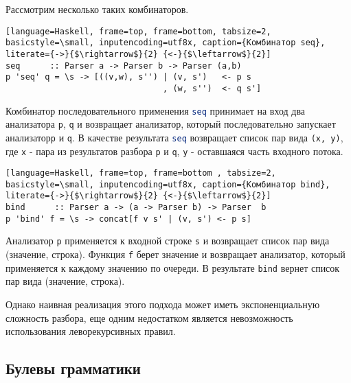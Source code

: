 \documentclass[14pt]{matmex-diploma}
\begin{document}
Рассмотрим несколько таких комбинаторов.

\begin{lstlisting}[language=Haskell, frame=top, frame=bottom, tabsize=2, basicstyle=\small, inputencoding=utf8x, caption={Комбинатор seq}, literate={->}{$\rightarrow$}{2} {<-}{$\leftarrow$}{2}]
seq      :: Parser a -> Parser b -> Parser (a,b)
p 'seq' q = \s -> [((v,w), s'') | (v, s')   <- p s
                                , (w, s'')  <- q s']
\end{lstlisting}

Комбинатор последовательного применения \lstinline[language=Haskell]{seq} принимает на вход два анализатора \lstinline[language=Haskell]{p}, \lstinline[language=Haskell]{q} и возвращает анализатор, который последовательно запускает анализатор\lstinline[language=Haskell]{p} и \lstinline[language=Haskell]{q}. В качестве результата \lstinline[language=Haskell]{seq} возвращает список пар вида \lstinline[language=Haskell]{(x, y)}, где \lstinline[language=Haskell]{x} - пара из результатов разбора \lstinline[language=Haskell]{p} и \lstinline[language=Haskell]{q}, \lstinline[language=Haskell]{y} - оставшаяся часть входного потока.

\begin{lstlisting}[language=Haskell, frame=top, frame=bottom , tabsize=2, basicstyle=\small, inputencoding=utf8x, caption={Комбинатор bind}, literate={->}{$\rightarrow$}{2} {<-}{$\leftarrow$}{2}]
bind      :: Parser a -> (a -> Parser b) -> Parser  b
p 'bind' f = \s -> concat[f v s' | (v, s') <- p s]
\end{lstlisting}
   
Анализатор \lstinline[language=Haskell]{p} применяется к входной строке \lstinline[language=Haskell]{s} и возвращает список пар вида (значение, строка). Функция \lstinline[language=Haskell]{f} берет значение и возвращает анализатор, который применяется к каждому значению по очереди. В результате \lstinline[language=Haskell]{bind} вернет список пар вида (значение, строка).
   
Однако наивная реализация этого подхода может иметь экспоненциальную сложность разбора, еще одним недостатком является невозможность использования леворекурсивных правил. %
   
    \subsection{Булевы грамматики}
    
\end{document}
